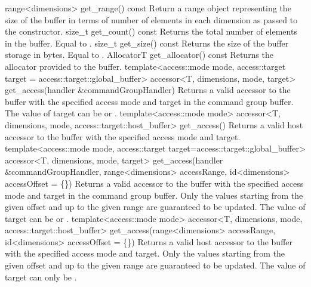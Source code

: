   \addRow
    {range<dimensions> get_range() const}
    {
      Return a range object representing the
      size of the buffer in terms of number
      of elements in each dimension as passed
      to the constructor.
    }
  \addRow
    {size_t get_count() const}
    {
      Returns the total number of elements in the buffer.
      Equal to .
    }
  \addRow
    {size_t get_size() const}
    {
      Returns the size of the buffer storage in bytes.
      Equal to .
    }
  \addRow
    {AllocatorT get_allocator() const}
    {
      Returns the allocator provided to the buffer.
    }
  \addRowThreeSL
    {template<access::mode mode, access::target target = access::target::global_buffer>}
    {accessor<T, dimensions, mode, target> }
    {get_access(handler \&commandGroupHandler)}
    {
      Returns a valid accessor to the buffer with the specified
      access mode and target in the command group buffer.
      The value of target can be
      \mbox{} or
      .
    }
  \addRowThreeSL
    {template<access::mode mode>}
    {accessor<T, dimensions, mode, access::target::host_buffer> }
    {get_access()}
    {
      Returns a valid host accessor to the buffer with the specified
      access mode and target.
    }
  \addRowThreeSL
    {template<access::mode mode, access::target target=access::target::global_buffer>}
    {accessor<T, dimensions, mode, target> }
    {get_access(handler \&commandGroupHandler, range<dimensions> accessRange,
       id<dimensions> accessOffset = \{\})}
    {
      Returns a valid accessor to the buffer with the specified
      access mode and target in the command group buffer.
      Only the values starting from the given offset and up to the given 
      range are guaranteed to be updated.
      The value of target can be
      \mbox{} or
      .
    }
  \addRowThreeSL
    {template<access::mode mode>}
    {accessor<T, dimensions, mode, access::target::host_buffer> }
    {get_access(range<dimensions> accessRange, id<dimensions> accessOffset = \{\})}
    {
      Returns a valid host accessor to the buffer with the specified
      access mode and target. 
      Only the values starting from the given offset and up to the given 
      range are guaranteed to be updated.
      The value of target can only be
      .
    }

